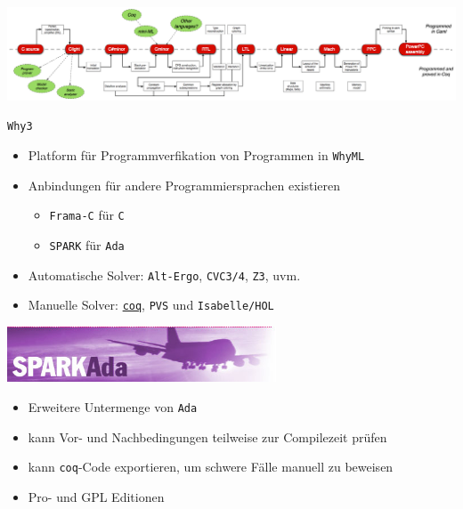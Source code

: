 \documentclass[aspectratio=169]{beamer}
\begin{document}
\begin{frame}
  \begin{center}
    \includegraphics[width=20.0cm]{compcert_diagram.png}
  \end{center}
\end{frame}
\begin{frame}
  \begin{center}
    \Large{\texttt{Why3}}
  \end{center}
  \begin{itemize}
  \item Platform für Programmverfikation von Programmen in \texttt{WhyML}
  \item Anbindungen für andere Programmiersprachen existieren
    \begin{itemize}
    \item \texttt{Frama-C} für \texttt{C}
    \item \texttt{SPARK} für \texttt{Ada}
    \end{itemize}
  \item Automatische Solver: \texttt{Alt-Ergo}, \texttt{CVC3/4}, \texttt{Z3}, uvm. 
  \item Manuelle Solver: \underline{\texttt{coq}}, \texttt{PVS} und \texttt{Isabelle/HOL}
  \end{itemize}
\end{frame}
\begin{frame}
  \begin{center}
    \includegraphics[width=8.0cm]{spark_logo.jpg}    
  \end{center}
  \begin{itemize}
  \item Erweitere Untermenge von \texttt{Ada}
  \item kann Vor- und Nachbedingungen teilweise zur Compilezeit prüfen
  \item kann \texttt{coq}-Code exportieren, um schwere Fälle manuell zu beweisen
  \item Pro- und GPL Editionen
  \end{itemize}
\end{frame}
\end{document}
